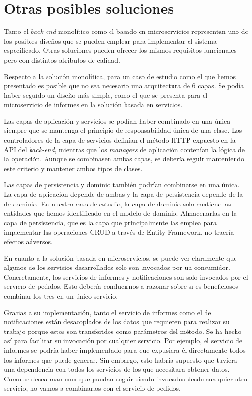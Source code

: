 \documentclass[11pt,spanish,listoffigures]{tfgetsinf}
\begin{document}
\section{Otras posibles soluciones}

Tanto el \textit{back-end} monolítico como el basado en microservicios representan uno de los posibles diseños que se pueden emplear para implementar el sistema especificado. Otras soluciones pueden ofrecer los mismos requisitos funcionales pero con distintos atributos de calidad.

Respecto a la solución monolítica, para un caso de estudio como el que hemos presentado es posible que no sea necesario una arquitectura de 6 capas. Se podía haber seguido un diseño más simple, como el que se presenta para el microservicio de informes en la solución basada en servicios. 

Las capas de aplicación y servicios se podían haber combinado en una única siempre que se mantenga el principio de responsabilidad única de una clase. Los controladores de la capa de servicios definían el método HTTP expuesto en la API del \textit{back-end}, mientras que los \textit{managers} de aplicación contenían la lógica de la operación. Aunque se combinasen ambas capas, se debería seguir manteniendo este criterio y mantener ambos tipos de clases.

Las capas de persistencia y dominio también podrían combinarse en una única. La capa de aplicación depende de ambas y la capa de persistencia depende de la de dominio. En nuestro caso de estudio, la capa de dominio solo contiene las entidades que hemos identificado en el modelo de dominio. Almacenarlas en la capa de persistencia, que es la capa que principalmente las emplea para implementar las operaciones CRUD a través de Entity Framework, no traería efectos adversos.

En cuanto a la solución basada en microservicios, se puede ver claramente que algunos de los servicios desarrollados solo son invocados por un consumidor. Concretamente, los servicios de informes y notificaciones son solo invocados por el servicio de pedidos. Esto debería conducirnos a razonar sobre si es beneficiosos combinar los tres en un único servicio. 

Gracias a su implementación, tanto el servicio de informes como el de notificaciones están desacoplados de los datos que requieren para realizar su trabajo porque estos son transferidos como parámetros del método. Se ha hecho así para facilitar su invocación por cualquier servicio. Por ejemplo, el servicio de informes se podría haber implementado para que expusiera él directamente todos los informes que puede generar. Sin embargo, esto habría supuesto que tuviera una dependencia con todos los servicios de los que necesitara obtener datos. Como se desea mantener que puedan seguir siendo invocados desde cualquier otro servicio, no vamos a combinarlos con el servicio de pedidos.
\end{document}
